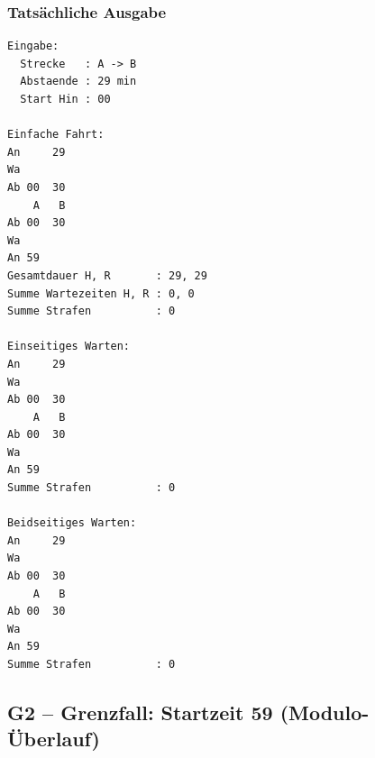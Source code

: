 \documentclass[12pt,a4paper]{article}
\begin{document}
\begin{minipage}[t]{0.48\textwidth}
\scriptsize
\subsubsection*{Tatsächliche Ausgabe}
\begin{lstlisting}
Eingabe:
  Strecke   : A -> B
  Abstaende : 29 min
  Start Hin : 00

Einfache Fahrt:
An     29
Wa
Ab 00  30
    A   B
Ab 00  30
Wa
An 59
Gesamtdauer H, R       : 29, 29
Summe Wartezeiten H, R : 0, 0
Summe Strafen          : 0

Einseitiges Warten:
An     29
Wa
Ab 00  30
    A   B
Ab 00  30
Wa
An 59
Summe Strafen          : 0

Beidseitiges Warten:
An     29
Wa
Ab 00  30
    A   B
Ab 00  30
Wa
An 59
Summe Strafen          : 0
\end{lstlisting}
\end{minipage}

\subsection{G2 – Grenzfall: Startzeit 59 (Modulo-Überlauf)}
\label{test:g2}
\end{document}

